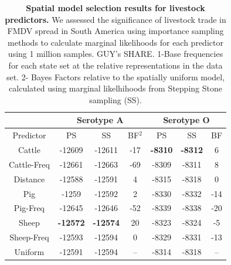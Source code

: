 \documentclass[10pt]{article}
\begin{document}
\begin{table}[!ht]
\caption{
\textbf{Spatial model selection results for livestock predictors. } We assessed the significance of livestock trade in FMDV spread in South America using importance sampling methods to calculate marginal likelihoods for each predictor using 1 million samples. GUY's SHARE. 1-Base frequencies for each state set at the relative representations in the data set. 2- Bayes Factors relative to the spatially uniform model, calculated using marginal likelhihoods from Stepping Stone sampling (SS).}
\begin{center}
\begin{tabular}{ccccccc}
\toprule
 &\multicolumn{3}{c}{Serotype A}& \multicolumn{3}{c}{Serotype O}\\
 \midrule
Predictor &PS&SS&BF$^2$&PS&SS&BF\\
Cattle&-12609&-12611&-17&\textbf{-8310}&\textbf{-8312}&6\\
Cattle-Freq&-12661&-12663&-69&-8309&-8311&8\\
Distance&-12588&-12591&4&-8315&-8318&0\\
Pig&-1259&-12592&2&-8330&-8332&-14\\
Pig-Freq&-12645&-12646&-52&-8339&-8338&-20\\
Sheep&\textbf{-12572}&\textbf{-12574}&20&-8323&-8324&-5\\
Sheep-Freq&-12593&-12594&0&-8329&-8331&-13\\
Uniform&-12591&-12594&--&-8314&-8318& --\\
\bottomrule
\end{tabular}
\end{center}
\begin{flushleft}
\end{flushleft}
\label{tab:preds}
 \end{table}
\end{document}
